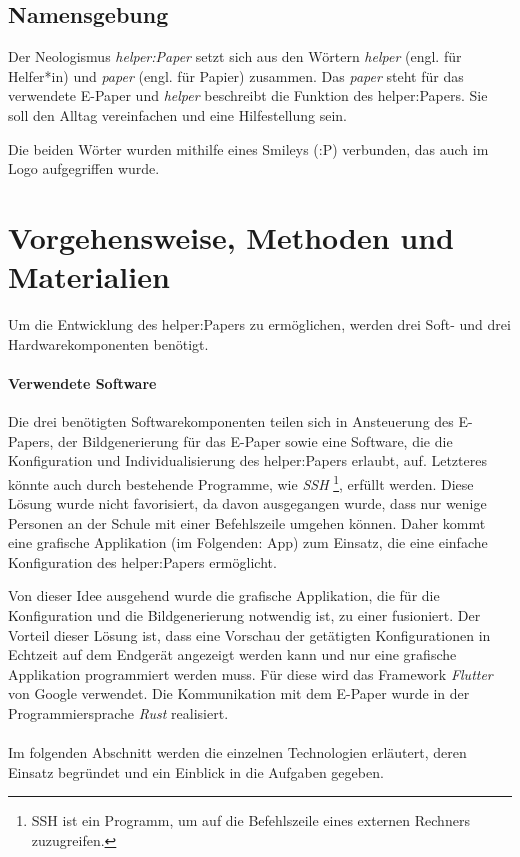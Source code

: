 \documentclass[10pt]{article}
\begin{document}
\subsection{Namensgebung}
Der Neologismus \textit{helper:Paper} setzt sich aus den Wörtern \textit{helper} (engl. für Helfer*in) und \textit{paper} (engl. für Papier) zusammen. Das \textit{paper} steht für das verwendete E-Paper und \textit{helper} beschreibt die Funktion des helper:Papers. Sie soll den Alltag vereinfachen und eine Hilfestellung sein. 

Die beiden Wörter wurden mithilfe eines Smileys (:P) verbunden, das auch im Logo aufgegriffen wurde. 

\section{Vorgehensweise, Methoden und Materialien}\label{Methoden-Material}
Um die Entwicklung des helper:Papers zu ermöglichen, werden drei Soft- und drei Hardwarekomponenten benötigt.

\paragraph{Verwendete Software}
Die drei benötigten Softwarekomponenten teilen sich in Ansteuerung des E-Papers, der Bildgenerierung für das E-Paper sowie eine Software, die die Konfiguration und Individualisierung des helper:Papers erlaubt, auf. Letzteres könnte auch durch bestehende Programme, wie \textit{SSH} \footnote{SSH ist ein Programm, um auf die Befehlszeile eines externen Rechners zuzugreifen.}, erfüllt werden. Diese Lösung wurde nicht favorisiert, 
da davon ausgegangen wurde, dass nur wenige Personen an der Schule mit einer Befehlszeile umgehen können. Daher kommt eine grafische Applikation (im Folgenden: App) zum Einsatz, die eine einfache Konfiguration des helper:Papers ermöglicht.

Von dieser Idee ausgehend wurde die grafische Applikation, die für die Konfiguration und die Bildgenerierung notwendig ist, zu einer fusioniert. Der Vorteil dieser Lösung ist, dass eine Vorschau der getätigten Konfigurationen in Echtzeit auf dem Endgerät angezeigt werden kann und nur eine grafische Applikation programmiert werden muss. Für diese wird das Framework \textit{Flutter} von Google verwendet. Die Kommunikation mit dem E-Paper wurde in der Programmiersprache \textit{Rust} realisiert.\\\\
Im folgenden Abschnitt werden die einzelnen Technologien erläutert, deren Einsatz begründet und ein Einblick in die Aufgaben gegeben.
\end{document}
